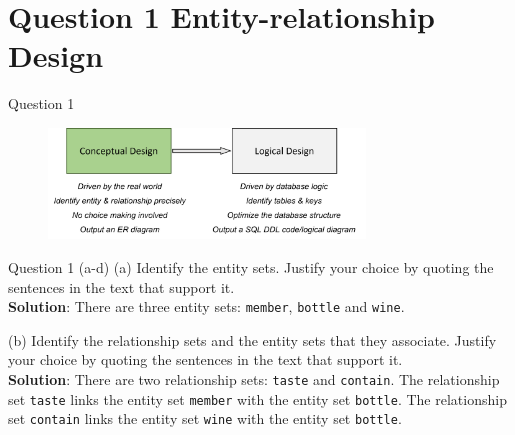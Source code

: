\section*{Question 1 Entity-relationship Design}

\begin{frame}[fragile]{Question 1}
\begin{figure}
	\includegraphics[width=0.75\textwidth, trim=0 0 0 0, clip]{t4/images/step1.png}
\end{figure}
\end{frame}

\begin{frame}[fragile]{Question 1 (a-d)}
(a) Identify the entity sets. Justify your choice by quoting the sentences in the text that support it.\\ \vspace{5pt}
\textbf{Solution}: There are three entity sets: \texttt{member}, \texttt{bottle} and \texttt{wine}.\\ \vspace{10pt}

(b) Identify the relationship sets and the entity sets that they associate. Justify your choice by quoting the sentences in the text that support it.\\ \vspace{5pt}
\textbf{Solution}: There are two relationship sets: \texttt{taste} and \texttt{contain}. The relationship set \texttt{taste} links the entity set \texttt{member} with the entity set \texttt{bottle}. The relationship set \texttt{contain} links the entity set \texttt{wine} with the entity set \texttt{bottle}.
\end{frame}

